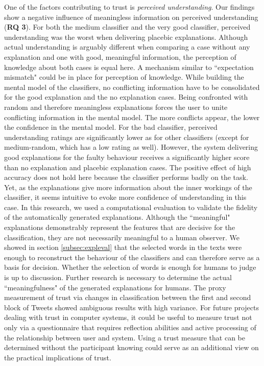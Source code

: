 One of the factors contributing to trust is \textit{perceived understanding}. Our findings show a negative influence of meaningless information on perceived understanding (\textbf{RQ 3}). For both the medium classifier and the very good classifier, perceived understanding was the worst when delivering placebic explanations. Although actual understanding is arguably different when comparing a case without any explanation and one with good, meaningful information, the perception of knowledge about both cases is equal here. A mechanism similar to ``expectation mismatch" could be in place for perception of knowledge. While building the mental model of the classifiers, no conflicting information have to be consolidated for the good explanation and the no explanation cases. Being confronted with random and therefore meaningless explanations forces the user to unite conflicting information in the mental model. The more conflicts appear, the lower the confidence in the mental model.\newline
For the bad classifier, perceived understanding ratings are significantly lower as for other classifiers (except for medium-random, which has a low rating as well). However, the system delivering good explanations for the faulty behaviour receives a significantly higher score than no explanation and placebic explanation cases. The positive effect of high accuracy does not hold here because the classifier performs badly on the task. Yet, as the explanations give more information about the inner workings of the classifier, it seems intuitive to evoke more confidence of understanding in this case. \medskip \newline
In this research, we used a computational evaluation to validate the fidelity of the automatically generated explanations. Although the ``meaningful" explanations demonstrably represent the features that are decisive for the classification, they are not necessarily meaningful to a human observer. We showed in section \ref{subsec:expleval} that the selected words in the texts were enough to reconstruct the behaviour of the classifiers and can therefore serve as a basis for decision. Whether the selection of words is enough for humans to judge is up to discussion. Further research is necessary to determine the actual ``meaningfulness" of the generated explanations for humans.\newline
The proxy measurement of trust via changes in classification between the first and second block of Tweets showed ambiguous results with high variance. For future projects dealing with trust in computer systems, it could be useful to measure trust not only via a questionnaire that requires reflection abilities and active processing of the relationship between user and system. Using a trust measure that can be determined without the participant knowing could serve as an additional view on the practical implications of trust.